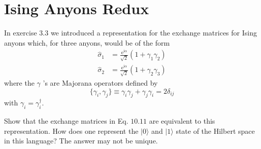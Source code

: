 \documentclass{book}
\begin{document}
\section{Ising Anyons Redux}
In exercise $3.3$ we introduced a representation for the exchange matrices for Ising anyons which, for three anyons, would be of the form
\begin{equation*}
\begin{aligned}
\hat{\sigma }_{1} & =\frac{\mathrm{e}^{\mathrm{i} \alpha }}{\sqrt{2}}( 1+\gamma _{1} \gamma _{2})\\
\hat{\sigma }_{2} & =\frac{\mathrm{e}^{\mathrm{i} \alpha }}{\sqrt{2}}( 1+\gamma _{2} \gamma _{3})
\end{aligned}
\end{equation*}
where the $\gamma $ 's are Majorana operators defined by
\begin{equation*}
\{\gamma _{i} ,\gamma _{j}\} \equiv \gamma _{i} \gamma _{j} +\gamma _{j} \gamma _{i} =2\delta _{ij}
\end{equation*}
with $\gamma _{i} =\gamma _{i}^{\dagger }$.

Show that the exchange matrices in Eq. $10.11$ are equivalent to this representation. How does one represent the $|0\rangle $ and $|1\rangle $ state of the Hilbert space in this language? The answer may not be unique.
\end{document}
